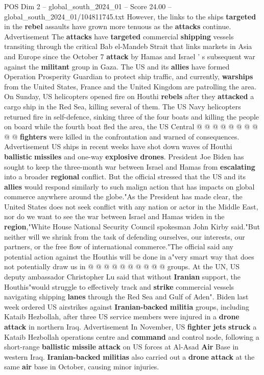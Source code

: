 \begin{textsample}{POS Dim 2 – global\_south\_2024\_01 – Score 24.00 – global\_south\_2024\_01/104811745.txt}
However, the links to the ships \textbf{targeted} in the \textbf{rebel} assaults have grown more tenuous as the \textbf{attacks} continue.
Advertisement The \textbf{attacks} have \textbf{targeted} commercial \textbf{shipping} vessels transiting through the critical Bab el-Mandeb Strait that links markets in Asia and Europe since the October 7 \textbf{attack} by Hamas and Israel ' s subsequent war against the \textbf{militant} group in Gaza.
The US and its \textbf{allies} have formed Operation Prosperity Guardian to protect ship traffic, and currently, \textbf{warships} from the United States, France and the United Kingdom are patrolling the area.
On Sunday, US helicopters opened fire on Houthi \textbf{rebels} after they \textbf{attacked} a cargo ship in the Red Sea, killing several of them.
The US Navy helicopters returned fire in self-defence, sinking three of the four boats and killing the people on board while the fourth boat fled the area, the US Central @ @ @ @ @ @ @ @ @ @ \textbf{fighters} were killed in the confrontation and warned of consequences.
Advertisement US ships in recent weeks have shot down waves of Houthi \textbf{ballistic} \textbf{missiles} and one-way \textbf{explosive} \textbf{drones}.
President Joe Biden has sought to keep the three-month war between Israel and Hamas from \textbf{escalating} into a broader \textbf{regional} conflict.
But the official stressed that the US and its \textbf{allies} would respond similarly to such malign action that has impacts on global commerce anywhere around the globe."As the President has made clear, the United States does not seek conflict with any nation or actor in the Middle East, nor do we want to see the war between Israel and Hamas widen in the \textbf{region},"White House National Security Council spokesman John Kirby said."But neither will we shrink from the task of defending ourselves, our interests, our partners, or the free flow of international commerce."The official said any potential action against the Houthis will be done in a"very smart way that does not potentially draw us in @ @ @ @ @ @ @ @ @ @ groups.
At the UN, US deputy ambassador Christopher Lu said that without \textbf{Iranian} support, the Houthis"would struggle to effectively track and \textbf{strike} commercial vessels navigating shipping \textbf{lanes} through the Red Sea and Gulf of Aden".
Biden last week ordered US airstrikes against \textbf{Iranian-backed} \textbf{militia} groups, including Kataib Hezbollah, after three US service members were injured in a \textbf{drone} \textbf{attack} in northern Iraq.
Advertisement In November, US \textbf{fighter} \textbf{jets} \textbf{struck} a Kataib Hezbollah operations centre and \textbf{command} and control node, following a short-range \textbf{ballistic} \textbf{missile} \textbf{attack} on US forces at Al-Asad \textbf{Air} Base in western Iraq. \textbf{Iranian-backed} \textbf{militias} also carried out a \textbf{drone} \textbf{attack} at the same \textbf{air} base in October, causing minor injuries.


\end{textsample}
